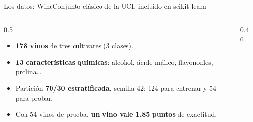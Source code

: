 \documentclass[aspectratio=169,10pt]{beamer}
\begin{document}
\begin{frame}{Los datos: Wine}{Conjunto clásico de la UCI, incluido en scikit-learn}
  \begin{columns}[T,onlytextwidth]
    \begin{column}{0.5\textwidth}
      \begin{itemize}\setlength{\itemsep}{4pt}
        \item \textbf{178 vinos} de tres cultivares (3 clases).
        \item \textbf{13 características químicas}: alcohol, ácido málico, flavonoides, prolina\ldots
        \item Partición \textbf{70/30 estratificada}, semilla 42: 124 para entrenar y 54 para probar.
        \item Con 54 vinos de prueba, \textbf{un vino vale 1,85 puntos} de exactitud.
      \end{itemize}
    \end{column}
    \begin{column}{0.46\textwidth}
    \end{column}
  \end{columns}
\end{frame}
\end{document}
